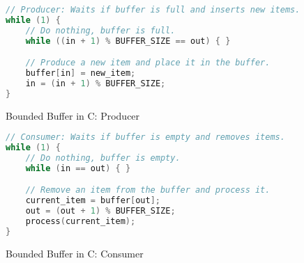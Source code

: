 \documentclass[a4paper, 11pt, accentcolor = tud3b]{tudreport}
\begin{document}
		            \begin{figure}[H]
		            	\centering
		            	\begin{lstlisting}[language = C]
// Producer: Waits if buffer is full and inserts new items.
while (1) {
	// Do nothing, buffer is full.
	while ((in + 1) % BUFFER_SIZE == out) { }

	// Produce a new item and place it in the buffer.
	buffer[in] = new_item;
	in = (in + 1) % BUFFER_SIZE;
}
\end{lstlisting}
		            	\caption{Bounded Buffer in C: Producer}
		            \end{figure}
	            
		            \begin{figure}[H]
			            \centering
			            \begin{lstlisting}[language = C]
// Consumer: Waits if buffer is empty and removes items.
while (1) {
	// Do nothing, buffer is empty.
	while (in == out) { }

	// Remove an item from the buffer and process it.
	current_item = buffer[out];
	out = (out + 1) % BUFFER_SIZE;
	process(current_item);
}
\end{lstlisting}
			            \caption{Bounded Buffer in C: Consumer}
			        \end{figure}
\end{document}
